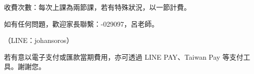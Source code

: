 \documentclass[a4paper]{article}
\newcommand{\qrUrl}{<<QR_URL>>}
\begin{document}
\newpage

\vspace*{5mm}

{\large 收費次數：每次上課為兩節課，若有特殊狀況，以一節計費。}

\vspace{3mm}

{\large 如有任何問題，歡迎家長聯繫：-029097，呂老師。}

\begin{flushright}
{\large （LINE：johansoros）}
\end{flushright}

\vspace{3mm}

{\large 若有意以電子支付或匯款當期費用，亦可透過 LINE PAY、Taiwan Pay 等支付工具。謝謝您。}

\vfill

\begin{center}
\end{center}

\vspace{2cm}

\begin{center}
\qrcode[height=3.5cm]{\qrUrl}
\end{center}

\vfill
\end{document}
